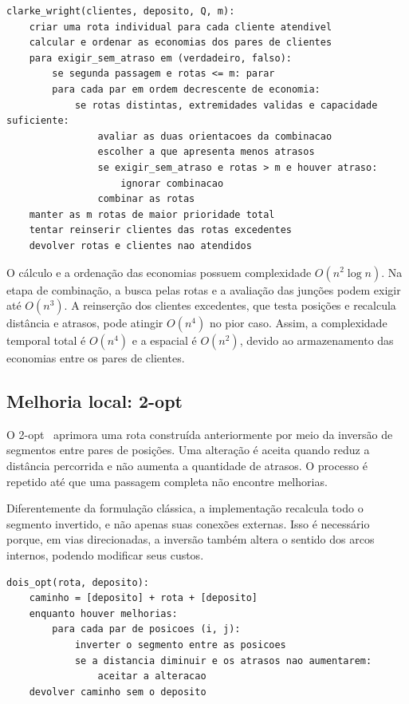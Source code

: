 \documentclass[12pt]{article}
\begin{document}
\begin{lstlisting}
clarke_wright(clientes, deposito, Q, m):
    criar uma rota individual para cada cliente atendivel
    calcular e ordenar as economias dos pares de clientes
    para exigir_sem_atraso em (verdadeiro, falso):
        se segunda passagem e rotas <= m: parar
        para cada par em ordem decrescente de economia:
            se rotas distintas, extremidades validas e capacidade suficiente:
                avaliar as duas orientacoes da combinacao
                escolher a que apresenta menos atrasos
                se exigir_sem_atraso e rotas > m e houver atraso:
                    ignorar combinacao
                combinar as rotas
    manter as m rotas de maior prioridade total
    tentar reinserir clientes das rotas excedentes
    devolver rotas e clientes nao atendidos
\end{lstlisting}

O cálculo e a ordenação das economias possuem complexidade $O(n^2 \log n)$. Na etapa
de combinação, a busca pelas rotas e a avaliação das junções podem exigir até
$O(n^3)$. A reinserção dos clientes excedentes, que testa posições e recalcula
distância e atrasos, pode atingir $O(n^4)$ no pior caso. Assim, a complexidade temporal
total é $O(n^4)$ e a espacial é $O(n^2)$, devido ao armazenamento das economias entre
os pares de clientes.

\subsection{Melhoria local: 2-opt}

O 2-opt~\cite{croes1958method} aprimora uma rota construída anteriormente por meio da
inversão de segmentos entre pares de posições. Uma alteração é aceita quando reduz a
distância percorrida e não aumenta a quantidade de atrasos. O processo é repetido até
que uma passagem completa não encontre melhorias.

Diferentemente da formulação clássica, a implementação recalcula todo o segmento
invertido, e não apenas suas conexões externas. Isso é necessário porque, em vias
direcionadas, a inversão também altera o sentido dos arcos internos, podendo modificar
seus custos.

\begin{lstlisting}
dois_opt(rota, deposito):
    caminho = [deposito] + rota + [deposito]
    enquanto houver melhorias:
        para cada par de posicoes (i, j):
            inverter o segmento entre as posicoes
            se a distancia diminuir e os atrasos nao aumentarem:
                aceitar a alteracao
    devolver caminho sem o deposito
\end{lstlisting}
\end{document}
